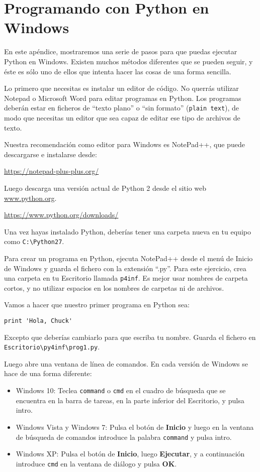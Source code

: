 
\chapter{Programando con Python en Windows}

En este apéndice, mostraremos una serie de pasos
para que puedas ejecutar Python en Windows. Existen muchos métodos
diferentes que se pueden seguir, y éste es sólo uno de ellos
que intenta hacer las cosas de una forma sencilla.

Lo primero que necesitas es instalar un editor de código. No
querrás utilizar Notepad o Microsoft Word para editar
programas en Python. Los programas deberán estar en ficheros de ``texto plano'' o ``sin formato''
({\tt plain text}), de modo que necesitas un editor que sea capaz de
editar ese tipo de archivos de texto.

Nuestra recomendación como editor para Windows es NotePad++, que
puede descargarse e instalarse desde:

\url{https://notepad-plus-plus.org/}

Luego descarga una versión actual de Python 2 desde el
sitio web \url{www.python.org}.

\url{https://www.python.org/downloads/}

Una vez hayas instalado Python, deberías tener una
carpeta nueva en tu equipo como {\tt C:{\textbackslash}Python27}.

Para crear un programa en Python, ejecuta NotePad++ desde el menú de Inicio de Windows
y guarda el fichero con la extensión ``.py''. Para este
ejercicio, crea una carpeta en tu Escritorio llamada
{\tt p4inf}. Es mejor usar nombres de carpeta cortos,
y no utilizar espacios en los nombres de carpetas ni de archivos.

Vamos a hacer que nuestro primer programa en Python sea:

\beforeverb
\begin{verbatim}
print 'Hola, Chuck'
\end{verbatim}
\afterverb
%
Excepto que deberías cambiarlo para que escriba tu nombre. Guarda el fichero
en {\tt Escritorio{\textbackslash}py4inf{\textbackslash}prog1.py}.

Luego abre una ventana de línea de comandos. En cada versión de Windows
se hace de una forma diferente:

\begin{itemize}
\item Windows 10: Teclea {\tt command} o {\tt cmd} en el cuadro de búsqueda
que se encuentra en la barra de tareas, en la parte inferior del Escritorio,
y pulsa intro.
	
\item Windows Vista y Windows 7: Pulsa el botón de {\bf Inicio}
y luego en la ventana de búsqueda de comandos introduce la palabra
{\tt command} y pulsa intro.

\item Windows XP: Pulsa el botón de {\bf Inicio}, luego {\bf Ejecutar}, y
a continuación introduce {\tt cmd} en la ventana de diálogo y pulsa {\bf OK}.
\end{itemize}

